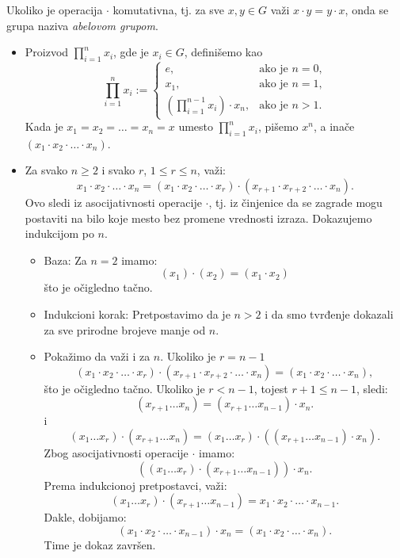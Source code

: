 \documentclass[a4paper,12pt]{article}
\begin{document}
Ukoliko je operacija \(\cdot\) komutativna, tj. za sve \(x, y \in G\) važi \(x \cdot y = y \cdot x\),
onda se grupa naziva \emph{abelovom grupom}.


\begin{itemize}
  \item Proizvod \( \prod_{i=1}^{n} x_i \), gde je \( x_i \in G \), definišemo kao
\[
\prod_{i=1}^{n} x_i :=
\begin{cases}
e, & \text{ako je } n = 0, \\[4pt]
x_1, & \text{ako je } n = 1, \\[4pt]
\left(\prod_{i=1}^{n-1} x_i\right)\cdot x_n, & \text{ako je } n > 1.
\end{cases}
\]
Kada je \( x_1 = x_2 = \dots = x_n = x \) umesto \( \prod_{i=1}^{n} x_i \), pišemo \( x^n \), a inače \(( x_1 \cdot x_2 \cdot \dots \cdot x_n )\).

\item Za svako \( n\geq 2\) i svako \( r\), \( 1 \leq r \leq n \), važi:
\[
x_1 \cdot x_2 \cdot \dots \cdot x_n = (x_1 \cdot x_2 \cdot \dots \cdot x_r) \cdot (x_{r+1} \cdot x_{r+2} \cdot \dots \cdot x_n).
\]
Ovo sledi iz asocijativnosti operacije \(\cdot\), tj. iz činjenice da se zagrade mogu postaviti na bilo koje mesto bez promene vrednosti izraza.
Dokazujemo indukcijom po \( n \).
\begin{itemize}
  \item Baza: Za \( n = 2 \) imamo:
  \[
    (x_1) \cdot (x_2) = (x_1 \cdot x_2)
    \]
  što je očigledno tačno.
  \item Indukcioni korak: Pretpostavimo da je \( n > 2 \) i da smo tvrđenje dokazali za sve prirodne brojeve manje od \( n \).
  \item Pokažimo da važi i za \( n \). Ukoliko je \( r = n - 1 \)
  \[
    (x_1 \cdot x_2 \cdot \dots \cdot x_r) \cdot (x_{r+1} \cdot x_{r+2} \cdot \dots \cdot x_n) = (x_1 \cdot x_2 \cdot \dots \cdot x_{n}),
  \]
  što je očigledno tačno.
  Ukoliko je \( r < n - 1 \), tojest \( r + 1 \le n - 1 \), sledi:
  \[
    (x_{r+1} \dots x_n) = (x_{r+1} \dots x_{n-1}) \cdot x_n.
  \]
  i
  \[
    (x_1 \dots x_r) \cdot (x_{r+1} \dots x_n) = (x_1 \dots x_r) \cdot ((x_{r+1} \dots x_{n-1}) \cdot x_n).
  \]
  Zbog asocijativnosti operacije \(\cdot\) imamo:
  \[
    ((x_1 \dots x_r) \cdot (x_{r+1} \dots x_{n-1})) \cdot x_n.
  \]
  Prema indukcionoj pretpostavci, važi:
  \[
    (x_1 \dots x_r) \cdot (x_{r+1} \dots x_{n-1}) = x_1 \cdot x_2 \cdot \dots \cdot x_{n-1}.
  \]
  Dakle, dobijamo:
  \[
    (x_1 \cdot x_2 \cdot \dots \cdot x_{n-1}) \cdot x_n = (x_1 \cdot x_2 \cdot \dots \cdot x_n).
  \]
  Time je dokaz završen. 


\end{itemize}
\end{itemize}
\end{document}
